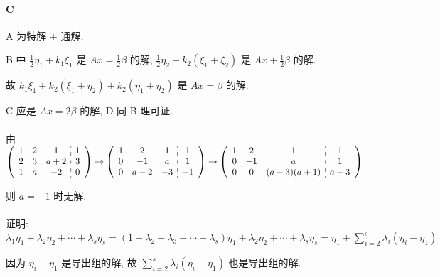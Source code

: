      \paragraph{C}
         A 为特解 + 通解,

         B 中 \(\frac{1}{2}\eta_{1} + k_{1}\xi_{1} \) 是 \( Ax = \frac{1}{2}\beta \) 的解, \(\frac{1}{2}\eta_2+k_2(\xi_1+\xi_2)\) 是 \(Ax+\frac{1}{2}\beta\) 的解.

         故 \( k_{1}\xi_{1} + k_{2}(\xi_{1}+\eta_{2}) + k_{2}(\eta_{1}+\eta_{2}) \) 是 \( Ax = \beta \) 的解.

         C 应是 \( Ax = 2\beta \) 的解, D 同 B 理可证.


     \paragraph{} %
         由 \( \left(\begin{array}{ccc:c}
                 1 & 2 & 1   & 1 \\
                 2 & 3 & a+2 & 3 \\
                 1 & a & -2  & 0
             \end{array}\right)
         \to
         \left(\begin{array}{ccc:c}
                 1 & 2   & 1  & 1  \\
                 0 & -1  & a  & 1  \\
                 0 & a-2 & -3 & -1
             \end{array}\right)
         \to
         \left(\begin{array}{ccc:c}
                 1 & 2  & 1          & 1   \\
                 0 & -1 & a          & 1   \\
                 0 & 0  & (a-3)(a+1) & a-3
             \end{array}\right) \)

         则 \( a = -1 \) 时无解.


     \paragraph{} %
         证明: \( \lambda_{1}\eta_{1} + \lambda_{2}\eta_{2} + \cdots + \lambda_{s}\eta_{s} = (1-\lambda_{2}-\lambda_{3}-\cdots-\lambda_{s})\eta_{1} + \lambda_{2}\eta_{2} + \cdots + \lambda_{s}\eta_{s} = \eta_{1} + \sum_{i=2}^{s}\lambda_{i}(\eta_{i}-\eta_{1}) \)

         因为 \( \eta_{i}-\eta_{1} \) 是导出组的解, 故 \( \sum_{i=2}^{s}\lambda_{i}(\eta_{i}-\eta_{1}) \) 也是导出组的解.

